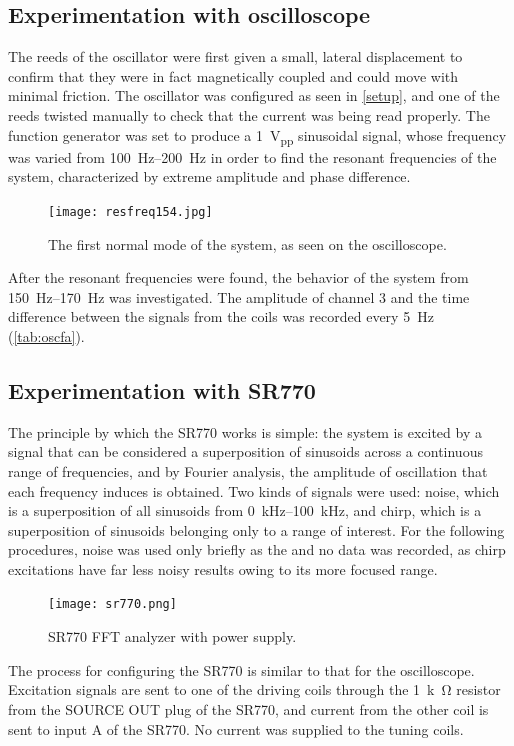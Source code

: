 \documentclass{article}
\begin{document}
\subsection{Experimentation with oscilloscope}
The reeds of the oscillator were first given a small, lateral displacement to confirm that they were in fact magnetically coupled and could move with minimal friction. The oscillator was configured as seen in \autoref{setup}, and one of the reeds twisted manually to check that the current was being read properly. The function generator was set to produce a \qty{1}{V_{pp}} sinusoidal signal, whose frequency was varied from \qtyrange{100}{200}{Hz} in order to find the resonant frequencies of the system, characterized by extreme amplitude and phase difference.
\begin{figure}
  \centering
  \texttt{[image: resfreq154.jpg]}
  \caption{The first normal mode of the system, as seen on the oscilloscope.}
\end{figure}

After the resonant frequencies were found, the behavior of the system from \qtyrange{150}{170}{Hz} was investigated. The amplitude of channel 3 and the time difference between the signals from the coils was recorded every \qty{5}{Hz} (\autoref{tab:oscfa}).

\subsection{Experimentation with SR770}
The principle by which the SR770 works is simple: the system is excited by a signal that can be considered a superposition of sinusoids across a continuous range of frequencies, and by Fourier analysis, the amplitude of oscillation that each frequency induces is obtained. Two kinds of signals were used: noise, which is a superposition of all sinusoids from \qtyrange{0}{100}{kHz}, and chirp, which is a superposition of sinusoids belonging only to a range of interest. For the following procedures, noise was used only briefly as the and no data was recorded, as chirp excitations have far less noisy results owing to its more focused range.

\begin{figure}
  \centering
  \texttt{[image: sr770.png]}
  \caption{SR770 FFT analyzer with power supply.}
\end{figure}

The process for configuring the SR770 is similar to that for the oscilloscope. Excitation signals are sent to one of the driving coils through the \qty{1}{k\ohm} resistor from the SOURCE OUT plug of the SR770, and current from the other coil is sent to input A of the SR770. No current was supplied to the tuning coils.
\end{document}
